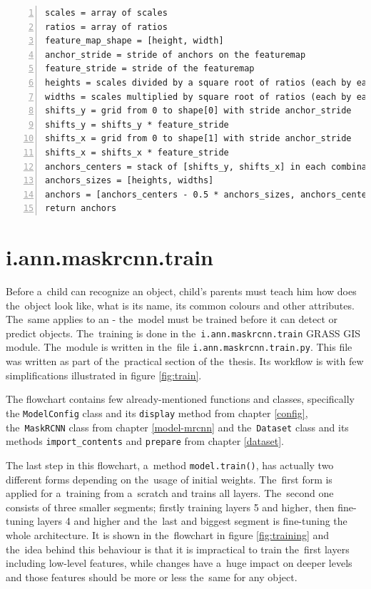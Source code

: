 {\scriptsize
\begin{lstlisting}[style=python, caption={generate\_anchors}, captionpos=b, 
label=code:anchors, deletekeywords={range, from, map, in},
backgroundcolor = \color{light-gray}, numbers=left, breaklines=true]
scales = array of scales
ratios = array of ratios
feature_map_shape = [height, width]
anchor_stride = stride of anchors on the featuremap
feature_stride = stride of the featuremap
heights = scales divided by a square root of ratios (each by each)
widths = scales multiplied by square root of ratios (each by each)
shifts_y = grid from 0 to shape[0] with stride anchor_stride
shifts_y = shifts_y * feature_stride
shifts_x = grid from 0 to shape[1] with stride anchor_stride
shifts_x = shifts_x * feature_stride
anchors_centers = stack of [shifts_y, shifts_x] in each combination
anchors_sizes = [heights, widths]
anchors = [anchors_centers - 0.5 * anchors_sizes, anchors_centers + 0.5 * anchors_sizes]
return anchors
\end{lstlisting}}

\section{i.ann.maskrcnn.train}
\label{train-module}

Before a~child can recognize an object, child's parents must teach him how 
does the~object look like, what is its name, its common colours and other 
attributes. The~same applies to an  - the~model must be trained before it 
can detect or predict objects. The~training is done in the~\verb|i.ann.maskrcnn.train|
GRASS GIS module. The~module is written in the~file
\verb|i.ann.maskrcnn.train.py|. This file was written as part of the~practical
section of the~thesis. Its workflow is with few simplifications illustrated in
figure \ref{fig:train}.

The flowchart contains few already-mentioned functions and classes, specifically 
the \verb|ModelConfig| class and its \verb|display| method from chapter 
\ref{config}, the~\verb|MaskRCNN| class from chapter \ref{model-mrcnn} and
the~\verb|Dataset| class and its methods \verb|import_contents| and \verb|prepare| 
from chapter \ref{dataset}.

The last step in this flowchart, a~method \verb|model.train()|, has actually two 
different forms depending on the~usage of initial weights. The~first form is 
applied for a~training from a~scratch and trains all layers. The~second one 
consists of three smaller segments; firstly training layers 5 and higher, then 
fine-tuning layers 4 and higher and the~last and biggest segment is fine-tuning 
the whole architecture. It is shown in the~flowchart in figure 
\ref{fig:training} and the~idea behind this behaviour is that it is impractical 
to train the~first layers including low-level features, while changes have
a~huge impact on deeper levels and those features should be more or less the~same 
for any object.

